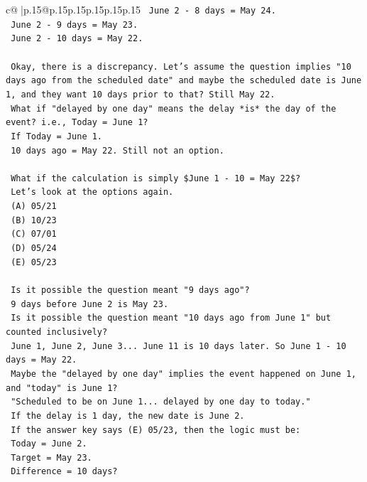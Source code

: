 \documentclass{article}
\begin{document}
{\begin{supertabular}{c@{$\;$}|p{.15\linewidth}@{}p{.15\linewidth}p{.15\linewidth}p{.15\linewidth}p{.15\linewidth}p{.15\linewidth}}
{{{\texttt{    June 2 {-} 8 days = May 24.} \\
\texttt{    June 2 {-} 9 days = May 23.} \\
\texttt{    June 2 {-} 10 days = May 22.} \\
\\ 
\texttt{    Okay, there is a discrepancy. Let's assume the question implies "10 days ago from the scheduled date" and maybe the scheduled date is June 1, and they want 10 days prior to that? Still May 22.} \\
\texttt{    What if "delayed by one day" means the delay *is* the day of the event? i.e., Today = June 1?} \\
\texttt{    If Today = June 1.} \\
\texttt{    10 days ago = May 22. Still not an option.} \\
\\ 
\texttt{    What if the calculation is simply \$June 1 {-} 10 = May 22\$?} \\
\texttt{    Let's look at the options again.} \\
\texttt{    (A) 05/21} \\
\texttt{    (B) 10/23} \\
\texttt{    (C) 07/01} \\
\texttt{    (D) 05/24} \\
\texttt{    (E) 05/23} \\
\\ 
\texttt{    Is it possible the question meant "9 days ago"?} \\
\texttt{    9 days before June 2 is May 23.} \\
\texttt{    Is it possible the question meant "10 days ago from June 1" but counted inclusively?} \\
\texttt{    June 1, June 2, June 3... June 11 is 10 days later. So June 1 {-} 10 days = May 22.} \\
\texttt{    Maybe the "delayed by one day" implies the event happened on June 1, and "today" is June 1?} \\
\texttt{    "Scheduled to be on June 1... delayed by one day to today."} \\
\texttt{    If the delay is 1 day, the new date is June 2.} \\
\texttt{    If the answer key says (E) 05/23, then the logic must be:} \\
\texttt{    Today = June 2.} \\
\texttt{    Target = May 23.} \\
\texttt{    Difference = 10 days?} \\
}}}
\end{supertabular}}
\end{document}

